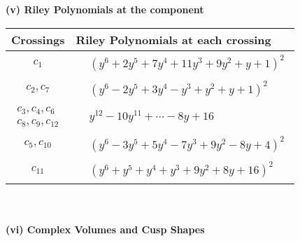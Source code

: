 \documentclass[1p]{elsarticle_modified}
\theoremstyle{definition}
\begin{document}
\newpage\renewcommand{\arraystretch}{1}
\flushleft \textbf{(v) Riley Polynomials at the component}\newline \\
\begin{tabular}{m{50pt}|m{274pt}}
Crossings & \hspace{64pt}Riley Polynomials at each crossing \\
\hline $$\begin{aligned}c_{1}\end{aligned}$$&$\begin{aligned}
&(y^6+2 y^5+7 y^4+11 y^3+9 y^2+y+1)^2
\end{aligned}$\\
\hline $$\begin{aligned}c_{2},c_{7}\end{aligned}$$&$\begin{aligned}
&(y^6-2 y^5+3 y^4- y^3+y^2+y+1)^2
\end{aligned}$\\
\hline $$\begin{aligned}c_{3},c_{4},c_{6}\\c_{8},c_{9},c_{12}\end{aligned}$$&$\begin{aligned}
&y^{12}-10 y^{11}+\cdots-8 y+16
\end{aligned}$\\
\hline $$\begin{aligned}c_{5},c_{10}\end{aligned}$$&$\begin{aligned}
&(y^6-3 y^5+5 y^4-7 y^3+9 y^2-8 y+4)^2
\end{aligned}$\\
\hline $$\begin{aligned}c_{11}\end{aligned}$$&$\begin{aligned}
&(y^6+y^5+y^4+y^3+9 y^2+8 y+16)^2
\end{aligned}$\\
\hline
\end{tabular}\\~\\
\newpage\flushleft \textbf{(vi) Complex Volumes and Cusp Shapes}
\end{document}

